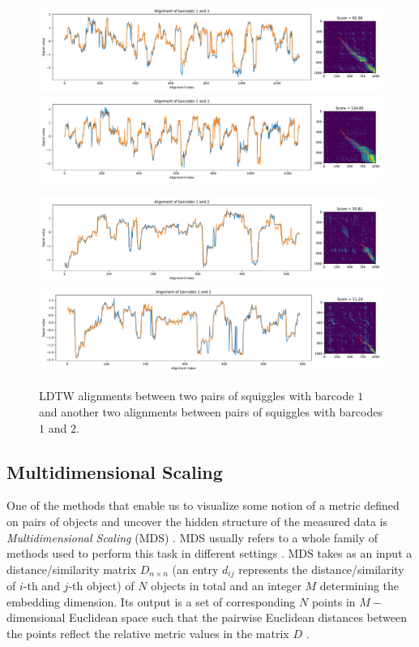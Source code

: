 \begin{figure}[ht] %
\includegraphics[scale=0.4]{images/bc1_bc1_1823_1739.pdf}
\includegraphics[scale=0.4]{images/bc1_bc1_1902_1453.pdf}

\includegraphics[scale=0.4]{images/bc1_bc2_1698_2660.pdf}
\includegraphics[scale=0.4]{images/bc1_bc2_2172_2742.pdf}

\caption[LDTW alignments between two pairs of squiggles]{LDTW alignments between two pairs of squiggles with barcode $1$ and another two alignments between pairs of squiggles with barcodes $1$ and $2$.} \label{fig:LDTW_alignments}
\end{figure}

\subsection{Multidimensional Scaling}
One of the methods that enable us to visualize some notion of a metric defined on pairs of objects and uncover the hidden structure of the measured data is \textit{Multidimensional Scaling} (MDS) \cite{kruskal1978multidimensional}. MDS usually refers to a whole family of methods used to perform this task in different settings \cite{mead1992review}. MDS takes as an input a distance/similarity matrix $D_{n\times n}$ (an entry $d_{ij}$ represents the distance/similarity of $i$-th and $j$-th object) of $N$ objects in total and an integer $M$ determining the embedding dimension. Its output is a set of corresponding $N$ points in $M-$dimensional Euclidean space such that the pairwise Euclidean distances between the points reflect the relative metric values in the matrix $D$ \cite{kruskal1978multidimensional, mead1992review}.

